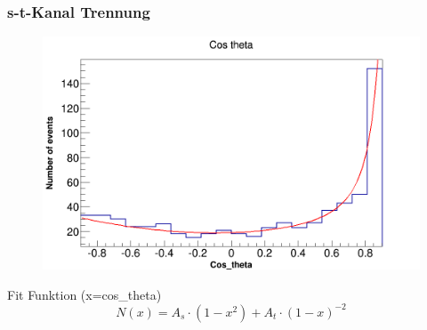 \begin{frame}
	\frametitle{s-t-Kanal Trennung}
	\begin{figure}
		\centering
		\includegraphics[width=0.85\linewidth]{../results/data_results/cosp_fits/stchannelexample46.png}
	\end{figure}
	\hspace{2cm} Fit Funktion (x=cos\_theta)
	\begin{equation*}
		N(x)=A_s\cdot(1-x^2)+A_t\cdot(1-x)^{-2}
	\end{equation*}
\end{frame}

